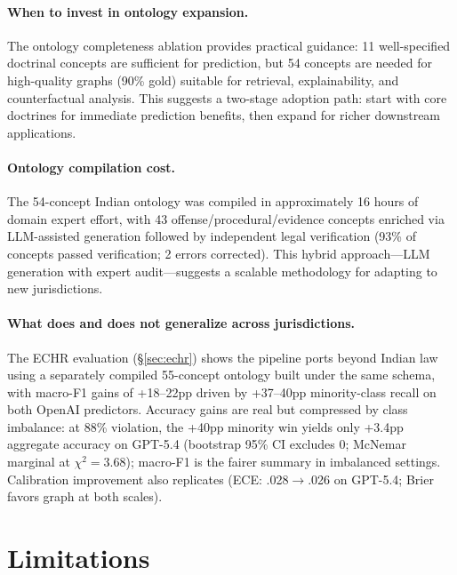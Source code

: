 \documentclass[11pt]{article}
\begin{document}
\paragraph{When to invest in ontology expansion.}
The ontology completeness ablation provides practical guidance: 11 well-specified doctrinal concepts are sufficient for prediction, but 54 concepts are needed for high-quality graphs (90\% gold) suitable for retrieval, explainability, and counterfactual analysis. This suggests a two-stage adoption path: start with core doctrines for immediate prediction benefits, then expand for richer downstream applications.

\paragraph{Ontology compilation cost.}
The 54-concept Indian ontology was compiled in approximately 16 hours of domain expert effort, with 43 offense/procedural/evidence concepts enriched via LLM-assisted generation followed by independent legal verification (93\% of concepts passed verification; 2 errors corrected). This hybrid approach---LLM generation with expert audit---suggests a scalable methodology for adapting to new jurisdictions.

\paragraph{What does and does not generalize across jurisdictions.}
The ECHR evaluation (\S\ref{sec:echr}) shows the pipeline ports beyond Indian law using a separately compiled 55-concept ontology built under the same schema, with macro-F1 gains of +18--22pp driven by +37--40pp minority-class recall on both OpenAI predictors. Accuracy gains are real but compressed by class imbalance: at 88\% violation, the +40pp minority win yields only +3.4pp aggregate accuracy on GPT-5.4 (bootstrap 95\% CI excludes 0; McNemar marginal at $\chi^2{=}3.68$); macro-F1 is the fairer summary in imbalanced settings. Calibration improvement also replicates (ECE: .028$\rightarrow$.026 on GPT-5.4; Brier favors graph at both scales).

\section{Limitations}
\label{sec:limitations}
\end{document}
